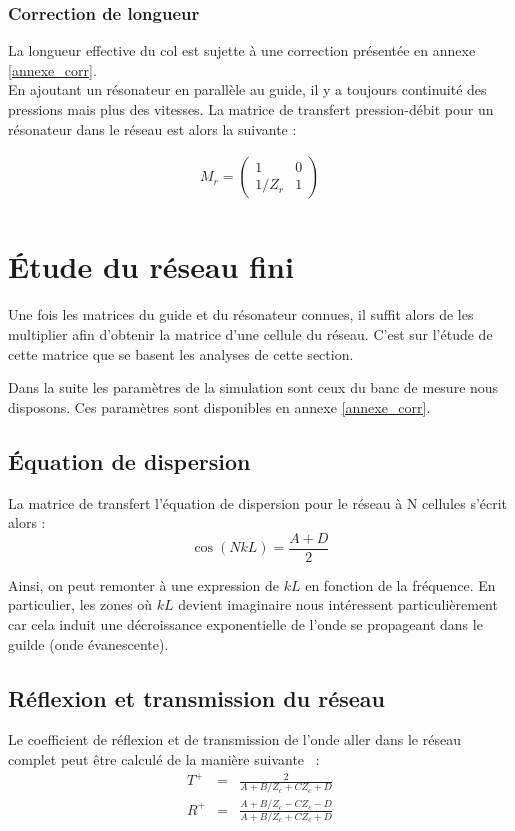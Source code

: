 \subsubsection{Correction de longueur}

La longueur effective du col est sujette à une correction présentée en annexe \ref{annexe_corr}.\\

En ajoutant un résonateur en parallèle au guide, il y a toujours continuité des pressions mais plus des vitesses. La matrice de transfert pression-débit pour un résonateur dans le réseau est alors la suivante :

\begin{eqnarray*}
M_{r} = \begin{pmatrix} 1 &  0 \\ 1 /Z_{r} & 1  \end{pmatrix}\\
\end{eqnarray*}

\section{Étude du réseau fini}

Une fois les matrices du guide et du résonateur connues, il suffit alors de les multiplier afin d'obtenir la matrice d'une cellule du réseau. C'est sur l'étude de cette matrice que se basent les analyses de cette section. 

Dans la suite les paramètres de la simulation sont ceux du banc de mesure nous disposons. Ces paramètres sont disponibles en annexe \ref{annexe_corr}.

\subsection{Équation de dispersion}
La matrice de transfert l'équation de dispersion pour le réseau à N cellules s'écrit alors : 
\begin{equation}\label{eq_dispersion}
\cos(NkL) = \frac{A+D}{2} 
\end{equation}

Ainsi, on peut remonter à une expression de $kL$ en fonction de la fréquence. En particulier, les zones où $kL$ devient imaginaire nous intéressent particulièrement car cela induit une décroissance exponentielle de l'onde se propageant dans le guilde (onde évanescente).

\subsection{Réflexion et transmission du réseau}
Le coefficient de réflexion et de transmission de l'onde aller dans le réseau complet peut être calculé de la manière suivante ~\cite{guide_dalmont}: 
\begin{eqnarray}
T^{+} & = & \frac{2}{A + B/Z_c + C Z_c + D} \\
R^{+} & = & \frac{A + B / Z_c - C Z_c -D}{A + B/Z_c + C Z_c + D} 
\end{eqnarray}

